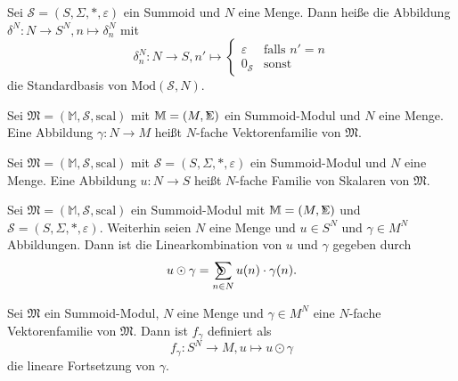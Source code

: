 \documentclass{article}
\DeclareMathOperator*{\Sigmacirc}{%
  \ThisStyle{\mathop{\ensurestackMath{\stackinset{c}{-0.75\LMpt}{c}{}{%
  \rotatebox[origin=lb]{-90}{$\circ$}}{\SavedStyle\Sigma}}}}}
\DeclareMathOperator*{\sumcirc}{%
  \ThisStyle{\mathop{\ensurestackMath{\stackinset{c}{-1.5\LMpt}{c}{}{%
  \rotatebox[origin=lb]{-90}{$\SavedStyle\scalerel*{\bm\Circle}{%
  i}$}}{\SavedStyle\sum}}}}}
\begin{document}
\begin{definition}
  Sei $\mathcal{S} = (S, \Sigma, \ast, \varepsilon)$ ein Summoid und $N$ eine Menge.
  Dann heiße die Abbildung $\delta^N \colon N \to S^N, n \mapsto \delta^N_n$ mit
  \begin{equation*}
    \delta^N_n \colon N \to S, n' \mapsto
    \begin{cases}
      \varepsilon & \text{falls } n' = n \\
      0_\mathcal{S} & \text{sonst}
    \end{cases}
  \end{equation*}
  die Standardbasis von $\text{Mod}(\mathcal{S}, N)$.
\end{definition}

\begin{definition}
  Sei $\mathfrak{M} = (\mathbb{M}, \mathcal{S}, \text{scal})$ mit $\mathbb{M} = (M, \Sigmacirc)$ ein Summoid-Modul und $N$ eine Menge.
  Eine Abbildung $\gamma \colon N \to M$ heißt $N$-fache Vektorenfamilie von $\mathfrak{M}$.
\end{definition}

\begin{definition}
  Sei $\mathfrak{M} = (\mathbb{M}, \mathcal{S}, \text{scal})$ mit $\mathcal{S} = (S, \Sigma, \ast, \varepsilon)$ ein Summoid-Modul und $N$ eine Menge.
  Eine Abbildung $u \colon N \to S$ heißt $N$-fache Familie von Skalaren von $\mathfrak{M}$.
\end{definition}

\begin{definition}
  Sei $\mathfrak{M} = (\mathbb{M}, \mathcal{S}, \text{scal})$ ein Summoid-Modul mit
  $\mathbb{M} = (M, \Sigmacirc)$ und $\mathcal{S} = (S, \Sigma, \ast, \varepsilon)$.
  Weiterhin seien $N$ eine Menge und $u \in S^N$ und $\gamma \in M^N$ Abbildungen.
  Dann ist die Linearkombination von $u$ und $\gamma$ gegeben durch
  \begin{equation*}
    u \odot \gamma = \sumcirc_{n \in N}u(n) \cdot \gamma(n).
  \end{equation*}
\end{definition}

\begin{definition}
  Sei $\mathfrak{M}$ ein Summoid-Modul, $N$ eine Menge und $\gamma \in M^N$ eine $N$-fache Vektorenfamilie von $\mathfrak{M}$.
  Dann ist $f_\gamma$ definiert als
  \begin{equation*}
    f_\gamma \colon S^N \to M, u \mapsto u \odot \gamma
  \end{equation*}
  die lineare Fortsetzung von $\gamma$.
\end{definition}
\end{document}
